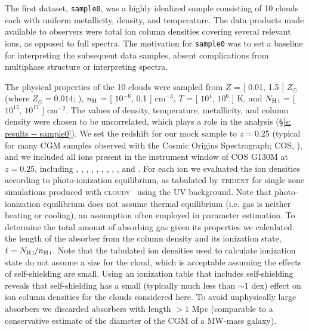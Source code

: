 \documentclass[fleqn,usenatbib]{mnras}
\begin{document}
The first dataset, \texttt{sample0}, was a highly idealized sample consisting of 10 clouds each with uniform metallicity, density, and temperature.
The data products made available to observers were total  ion column densities covering several relevant ions, as opposed to full spectra.
The motivation for \texttt{sample0} was to set a baseline for interpreting the subsequent data samples, absent complications from multiphase structure or interpreting spectra.

The physical properties of the 10 clouds were sampled from $Z$ = [ 0.01, 1.5 ] $Z_\odot$ (where $Z_\odot = 0.014$; \citealt{asplund2009Chemical}), $n_{\rm H}$ = [ $10^{-6}$, 0.1 ] cm$^{-3}$, $T$ = [ $10^4$, $10^6$ ] K, and $N_{\ion{H}{I}}$ = [ $10^{15}$, $10^{17}$ ] cm$^{-2}$.
The values of density, temperature, metallicity, and  column density were chosen to be uncorrelated, which plays a role in the analysis (\S\ref{s: results -- sample0}).
We set the redshift for our mock sample to $z=0.25$ (typical for many CGM samples observed with the Cosmic Origins Spectrograph; COS, \citealt{green2012COSMIC}), and we included all ions present in the instrument window of COS G130M at $z=0.25$, including , , , , , , ,  , , and .
For each ion we evaluated the ion densities according to photo-ionization equilibrium, as tabulated by \textsc{trident} for single zone simulations produced with \textsc{cloudy}~\citep{ferland20132013} using the \cite{haardt2012RADIATIVE} UV background.
Note that photo-ionization equilibrium does not assume thermal equilibrium (i.e. gas is neither heating or cooling),
an assumption often employed in parameter estimation.
To determine the total amount of absorbing gas given its properties we calculated the length of the absorber from the  column density and its ionization state, $\ell = N_{\ion{H}{I}} / n_{\ion{H}{I}}$.
Note that the tabulated ion densities used to calculate ionization state do not assume a size for the cloud, which is acceptable assuming the effects of self-shielding are small.
Using an ionization table that includes self-shielding reveals that self-shielding has a small (typically much less than $\sim 1$ dex) effect on ion column densities for the clouds considered here.
To avoid unphysically large absorbers we discarded absorbers with length $> 1$ Mpc (comparable to a conservative estimate of the diameter of the CGM of a MW-mass galaxy).
\end{document}
